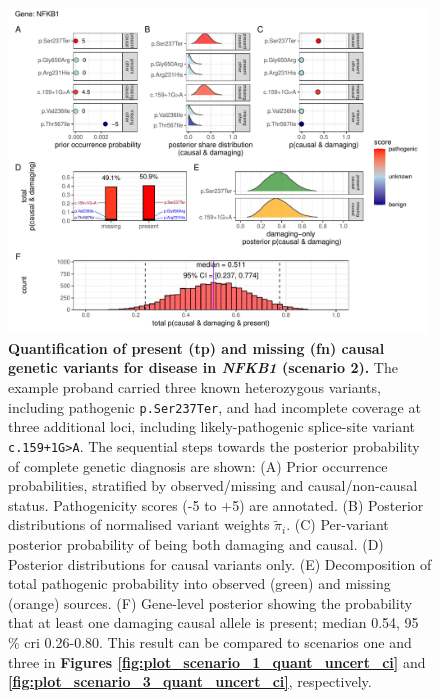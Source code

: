 \begin{figure}[ht]
  \centering
  \includegraphics[width=0.99\textwidth]{../images/plot_scenario_2_quant_uncert_ci.pdf}
  \caption{
    \textbf{Quantification of present (\ac{tp}) and missing (\ac{fn}) causal genetic variants for disease in \textit{NFKB1} (scenario 2).}
    The example proband carried three known heterozygous variants, including pathogenic \texttt{p.Ser237Ter}, and had incomplete coverage at three additional loci, including likely-pathogenic splice-site variant \texttt{c.159+1G{\small\textgreater}A}.  The sequential steps towards the posterior  probability of complete genetic diagnosis are shown:
    (A) Prior occurrence probabilities, stratified by observed/missing and causal/non-causal status. Pathogenicity scores (-5 to +5) are annotated.
    (B) Posterior distributions of normalised variant weights \(\tilde{\pi}_i\).  
    (C) Per-variant posterior probability of being both damaging and causal.  
    (D) Posterior distributions for causal variants only.  
    (E) Decomposition of total pathogenic probability into observed (green) and missing (orange) sources.  
    (F) Gene-level posterior showing the probability that at least one damaging causal allele is present; median 0.54, 95\,\% \ac{cri} 0.26-0.80. This result can be compared to scenarios one and three in 
    \textbf{Figures \ref{fig:plot_scenario_1_quant_uncert_ci}} and
    \textbf{\ref{fig:plot_scenario_3_quant_uncert_ci}}, respectively.
  }
  \label{fig:plot_scenario_2_quant_uncert_ci}
\end{figure}

\FloatBarrier

